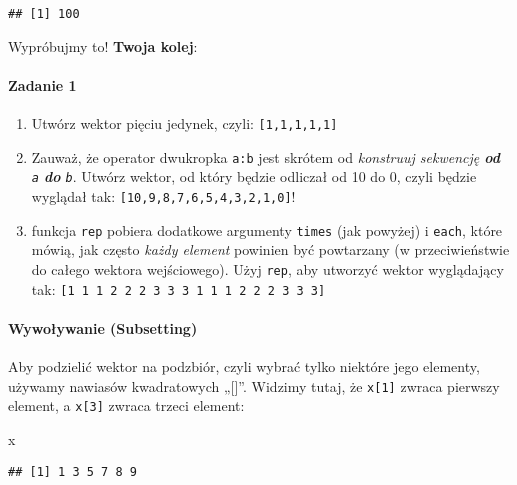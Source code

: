 \documentclass[
]{article}
\newenvironment{Shaded}{\begin{snugshade}}{\end{snugshade}}
\newcommand{\NormalTok}[1]{#1}
\providecommand{\tightlist}{%
  \setlength{\itemsep}{0pt}\setlength{\parskip}{0pt}}
\begin{document}
\begin{verbatim}
## [1] 100
\end{verbatim}

\begin{warning}
Wypróbujmy to! \textbf{Twoja kolej}:
\end{warning}

\hypertarget{zadanie-1}{%
\paragraph{Zadanie 1}\label{zadanie-1}}

\begin{enumerate}
\def\labelenumi{\arabic{enumi}.}
\tightlist
\item
  Utwórz wektor pięciu jedynek, czyli: \texttt{{[}1,1,1,1,1{]}}
\item
  Zauważ, że operator dwukropka \texttt{a:b} jest skrótem od
  \emph{konstruuj sekwencję \textbf{od} \texttt{a} \textbf{do}
  \texttt{b}}. Utwórz wektor, od który będzie odliczał od 10 do 0, czyli
  będzie wyglądał tak: \texttt{{[}10,9,8,7,6,5,4,3,2,1,0{]}}!
\item
  funkcja \texttt{rep} pobiera dodatkowe argumenty \texttt{times} (jak
  powyżej) i \texttt{each}, które mówią, jak często \emph{każdy element}
  powinien być powtarzany (w przeciwieństwie do całego wektora
  wejściowego). Użyj \texttt{rep}, aby utworzyć wektor wyglądający tak:
  \texttt{{[}1\ 1\ 1\ 2\ 2\ 2\ 3\ 3\ 3\ 1\ 1\ 1\ 2\ 2\ 2\ 3\ 3\ 3{]}}
\end{enumerate}

\hypertarget{wywoux142ywanie-subsetting}{%
\paragraph{Wywoływanie (Subsetting)}\label{wywoux142ywanie-subsetting}}

Aby podzielić wektor na podzbiór, czyli wybrać tylko niektóre jego
elementy, używamy nawiasów kwadratowych „{[}{]}''. Widzimy tutaj, że
\texttt{x{[}1{]}} zwraca pierwszy element, a \texttt{x{[}3{]}} zwraca
trzeci element:

\begin{Shaded}
\begin{Highlighting}[]
\NormalTok{x}
\end{Highlighting}
\end{Shaded}

\begin{verbatim}
## [1] 1 3 5 7 8 9
\end{verbatim}
\end{document}
